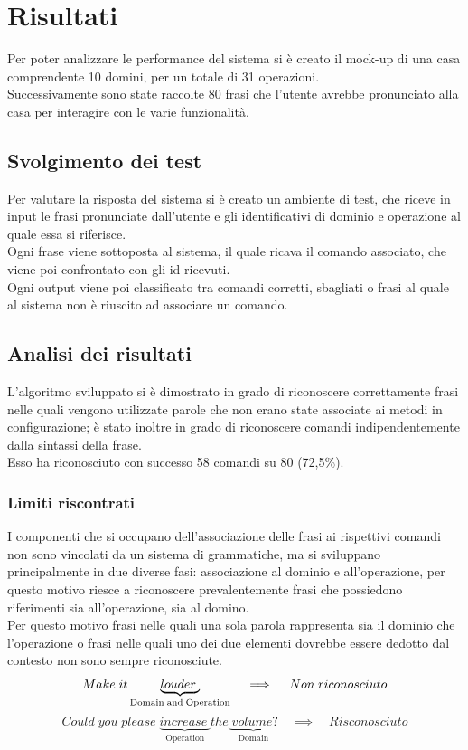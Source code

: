 \documentclass[twoside]{supsistudent}
\begin{document}
\chapter{Risultati}
Per poter analizzare le performance del sistema si è creato il mock-up di una casa comprendente 10 domini, per un totale di 31 operazioni. \\
Successivamente sono state raccolte 80 frasi che l'utente avrebbe pronunciato alla casa per interagire con le varie funzionalità.
\section{Svolgimento dei test}
Per valutare la risposta del sistema si è creato un ambiente di test, che riceve in input le frasi pronunciate dall'utente e gli identificativi di dominio e operazione al quale essa si riferisce.\\
Ogni frase viene sottoposta al sistema, il quale ricava il comando associato, che viene poi confrontato con gli id ricevuti.\\
Ogni output viene poi classificato tra comandi corretti, sbagliati o frasi al quale al sistema non è riuscito ad associare un comando.
\section{Analisi dei risultati}
L'algoritmo sviluppato si è dimostrato in grado di riconoscere correttamente frasi nelle quali vengono utilizzate parole che non erano state associate ai metodi in configurazione; è stato inoltre in grado di riconoscere comandi indipendentemente dalla sintassi della frase.\\
Esso ha riconosciuto con successo 58 comandi su 80 (72,5\%).
\subsection{Limiti riscontrati}
I componenti che si occupano dell'associazione delle frasi ai rispettivi comandi non sono vincolati da un sistema di grammatiche, ma si sviluppano principalmente in due diverse fasi: associazione al dominio e all'operazione, per questo motivo riesce a riconoscere prevalentemente frasi che possiedono riferimenti sia all'operazione, sia al domino. \\
Per questo motivo frasi nelle quali una sola parola rappresenta sia il dominio che l'operazione o frasi nelle quali uno dei due elementi dovrebbe essere dedotto dal contesto non sono sempre riconosciute.
\[
 Make\;it
\underbrace{louder\;}_\text{Domain\;and\;Operation}
 \quad\implies\quad Non\;riconosciuto
\]
\[
 Could\;you\;please\;
\underbrace{increase\;}_\text{Operation}the
\underbrace{\;volume?}_\text{Domain}
 \quad\implies\quad Risconosciuto
\]
\end{document}
